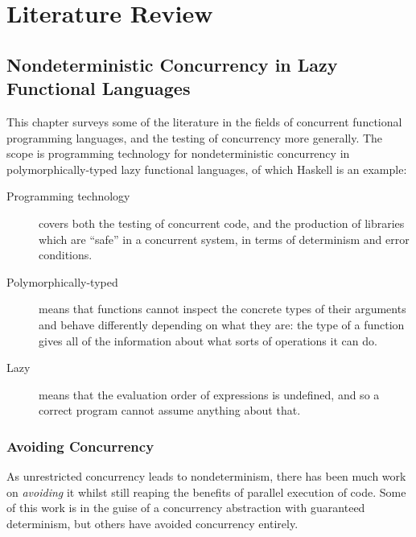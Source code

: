 \part{Literature Review}


\chapter{Nondeterministic Concurrency in Lazy Functional Languages}
\label{chp:litrev}

This chapter surveys some of the literature in the fields of
concurrent functional programming languages, and the testing of
concurrency more generally. The scope is programming technology for
nondeterministic concurrency in polymorphically-typed lazy functional
languages, of which Haskell is an example:

\begin{description}
  \item[Programming technology] covers both the testing of concurrent
    code, and the production of libraries which are ``safe'' in a
    concurrent system, in terms of determinism and error conditions.

  \item[Polymorphically-typed] means that functions cannot inspect the
    concrete types of their arguments and behave differently depending
    on what they are: the type of a function gives all of the
    information about what sorts of operations it can do.

  \item[Lazy] means that the evaluation order of expressions is
    undefined, and so a correct program cannot assume anything about
    that.
\end{description}

\section{Avoiding Concurrency}
\label{sec:litrev-strategies}

As unrestricted concurrency leads to nondeterminism, there has been
much work on \textit{avoiding} it whilst still reaping the benefits of
parallel execution of code. Some of this work is in the guise of a
concurrency abstraction with guaranteed determinism, but others have
avoided concurrency entirely.

